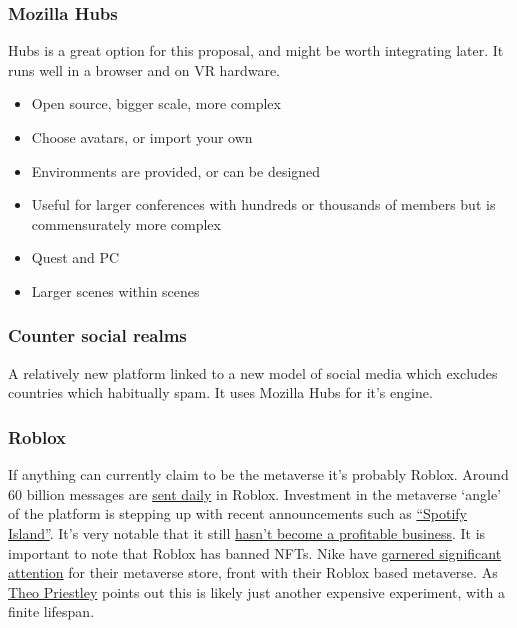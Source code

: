 \subsubsection{Mozilla Hubs}
Hubs is a great option for this proposal, and might be worth integrating later. It runs well in a browser and on VR hardware.
\begin{itemize}
\item Open source, bigger scale, more complex
\item Choose avatars, or import your own
\item Environments are provided, or can be designed
\item Useful for larger conferences with hundreds or thousands of members but is commensurately more complex
\item Quest and PC
\item Larger scenes within scenes
\end{itemize}
\subsubsection{Counter social realms}
A relatively new platform linked to a new model of social media which excludes countries which habitually spam. It uses Mozilla Hubs for it's engine.
\subsubsection{Roblox}
If anything can currently claim to be the metaverse it's probably Roblox. Around 60 billion messages are \href{https://podcasts.apple.com/us/podcast/developments-investments-experiences-in-the-metaverse/id1593908027?i=1000540906629}{sent daily} in Roblox. Investment in the metaverse `angle' of the platform is stepping up with recent announcements such as \href{https://techcrunch.com/2022/05/03/spotify-becomes-first-music-streamer-to-launch-on-roblox/?}{``Spotify Island''}. It's very notable that it still \href{https://fortune.com/2022/06/03/roblox-gaming-ecosystem-metaverse-stocks-profit/}{hasn't become a profitable business}. It is important to note that Roblox has banned NFTs. Nike have \href{https://www.thedrum.com/news/2022/09/22/21m-people-have-now-visited-nike-s-roblox-store-here-s-how-do-metaverse-commerce}{garnered significant attention} for their metaverse store, front with their Roblox based metaverse. As \href{https://medium.com/@theo/why-nikeland-is-not-the-metaverse-success-story-you-think-it-is-46742dc2f231}{Theo Priestley} points out this is likely just another expensive experiment, with a finite lifespan.

